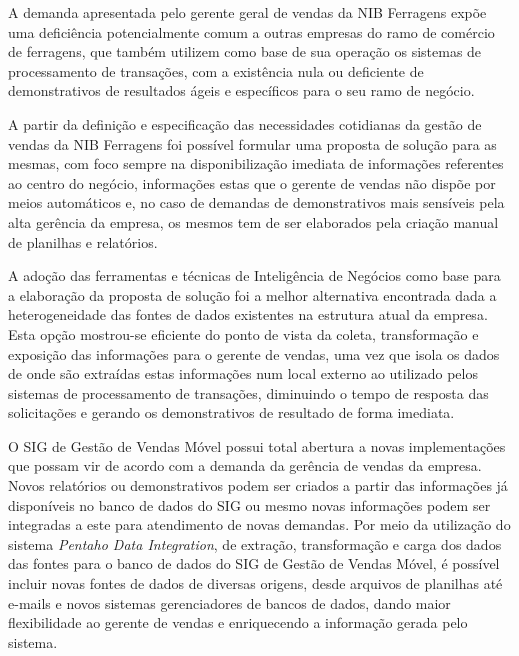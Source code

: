 \documentclass[a4paper]{article}
\begin{document}
\bigskip

{
\textsf{A demanda apresentada pelo gerente geral de vendas da NIB Ferragens exp\~oe uma defici\^encia potencialmente
comum a outras empresas do ramo de com\'ercio de ferragens, que tamb\'em utilizem como base de sua opera\c{c}\~ao os
sistemas de processamento de transa\c{c}\~oes, com a exist\^encia nula ou deficiente de demonstrativos de resultados
\'ageis e espec\'ificos para o seu ramo de neg\'ocio.}}

{
\textsf{A partir da defini\c{c}\~ao e especifica\c{c}\~ao das necessidades cotidianas da gest\~ao de vendas da NIB
Ferragens foi poss\'ivel formular uma proposta de solu\c{c}\~ao para as mesmas, com foco sempre na
disponibiliza\c{c}\~ao imediata de informa\c{c}\~oes referentes ao centro do neg\'ocio, informa\c{c}\~oes estas que o
gerente de vendas n\~ao disp\~oe por meios autom\'aticos e, no caso de demandas de demonstrativos mais sens\'iveis pela
alta ger\^encia da empresa, os mesmos tem de ser elaborados pela cria\c{c}\~ao manual de planilhas e relat\'orios.}}

{
\textsf{A ado\c{c}\~ao das ferramentas e t\'ecnicas de Intelig\^encia de Neg\'ocios como base para a elabora\c{c}\~ao da
proposta de solu\c{c}\~ao foi a melhor alternativa encontrada dada a heterogeneidade das fontes de dados existentes na
estrutura atual da empresa. Esta op\c{c}\~ao mostrou-se eficiente do ponto de vista da coleta, transforma\c{c}\~ao e
exposi\c{c}\~ao das informa\c{c}\~oes para o gerente de vendas, uma vez que isola os dados de onde s\~ao extra\'idas
estas informa\c{c}\~oes num local externo ao utilizado pelos sistemas de processamento de transa\c{c}\~oes, diminuindo
o tempo de resposta das solicita\c{c}\~oes e gerando os demonstrativos de resultado de forma imediata.}}

{
\textsf{O SIG de Gest\~ao de Vendas M\'ovel possui total abertura a novas implementa\c{c}\~oes que possam vir de acordo
com a demanda da ger\^encia de vendas da empresa. Novos relat\'orios ou demonstrativos podem ser criados a partir das
informa\c{c}\~oes j\'a dispon\'iveis no banco de dados do SIG ou mesmo novas informa\c{c}\~oes podem ser integradas a
este para atendimento de novas demandas. Por meio da utiliza\c{c}\~ao do sistema }\textsf{\textit{Pentaho Data
Integration}}\textsf{, de extra\c{c}\~ao, transforma\c{c}\~ao e carga dos dados das fontes para o banco de dados do SIG
de Gest\~ao de Vendas M\'ovel, \'e poss\'ivel incluir novas fontes de dados de diversas origens, desde arquivos de
planilhas at\'e e-mails e novos sistemas gerenciadores de bancos de dados, dando maior }\textsf{flexibilidade ao
gerente de vendas e enriquecendo a informa\c{c}\~ao gerada pelo sistema.}}
\end{document}
